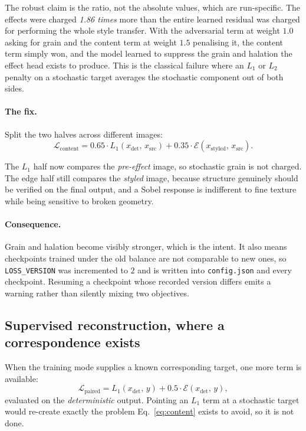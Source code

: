 \documentclass[11pt,a4paper]{article}
\newcommand{\code}[1]{\texttt{#1}}
\begin{document}
The robust claim is the ratio, not the absolute values, which are run-specific.
The effects were charged \emph{1.86 times} more than the entire
learned residual was charged for performing the whole style transfer. With the
adversarial term at weight $1.0$ asking for grain and the content term at weight
$1.5$ penalising it, the content term simply won, and the model learned to
suppress the grain and halation the effect head exists to produce. This is the
classical failure where an $L_1$ or $L_2$ penalty on a stochastic target averages
the stochastic component out of both sides.

\paragraph{The fix.} Split the two halves across different images:
\begin{equation}
  \mathcal{L}_{\mathrm{content}}
    = 0.65 \cdot L_1\!\left(x_{\text{det}},\, x_{\text{src}}\right)
    + 0.35 \cdot \mathcal{E}\!\left(x_{\text{styled}},\, x_{\text{src}}\right).
  \label{eq:content}
\end{equation}

The $L_1$ half now compares the \emph{pre-effect} image, so stochastic grain is
not charged. The edge half still compares the \emph{styled} image, because
structure genuinely should be verified on the final output, and a Sobel response
is indifferent to fine texture while being sensitive to broken geometry.

\paragraph{Consequence.} Grain and halation become visibly stronger, which is the
intent. It also means checkpoints trained under the old balance are not comparable
to new ones, so \code{LOSS\_VERSION} was incremented to $2$ and is written into
\code{config.json} and every checkpoint. Resuming a checkpoint whose recorded
version differs emits a warning rather than silently mixing two objectives.

\subsection{Supervised reconstruction, where a correspondence exists}

When the training mode supplies a known corresponding target, one more term is
available:
\begin{equation}
  \mathcal{L}_{\mathrm{paired}}
    = L_1\!\left(x_{\text{det}},\, y\right)
    + 0.5 \cdot \mathcal{E}\!\left(x_{\text{det}},\, y\right),
\end{equation}
evaluated on the \emph{deterministic} output. Pointing an $L_1$ term at a
stochastic target would re-create exactly the problem
Eq.~\eqref{eq:content} exists to avoid, so it is not done.
\end{document}
